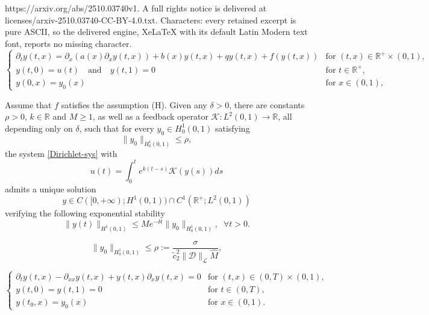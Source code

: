 \documentclass[10pt,a4paper]{amsart}
\begin{document}
https://arxiv.org/abs/2510.03740v1. A full rights notice is delivered at licenses/arxiv-2510.03740-CC-BY-4.0.txt. Characters: every retained excerpt is pure ASCII, so the delivered engine, XeLaTeX with its default Latin Modern text font, reports no missing character.
\begin{equation}\label{Dirichlet-sys}
\left\{\begin{array}{ll}
 \partial_t y(t,x) =\partial_x (a(x)\partial_x y( t,x))+{b(x)}y( t,x) +qy( t,x)+f(y( t,x))&\text{for }(t,x)\in \mathbb{R}^+ \times (0,1),\\[2mm]
y(t,0)=u(t)\quad \text{and}\quad y(t,1)=0&\text{for }t\in \mathbb{R}^+,\\[2mm]
y(0,x)=y_0(x )&\text{for }x\in (0,1),
\end{array}\right.
 \end{equation}

\begin{theorem}
     \label{main-th1}
      Assume that $f$ satisfies the assumption (H). Given any $\delta>0$, 
      there are constants $\rho>0$, $k\in \mathbb{R}$ and $M\ge 1$, as well as a {feedback operator $\mathcal{K}:L^2(0,1)\to \mathbb{R}$}, all depending only on $\delta$, such that for every $y_0\in H^1_0(0,1)$ satisfying
         \begin{equation*}
             \|y_0\|_{H^1_0(0,1)}\le \rho,
         \end{equation*}
        the system \eqref{Dirichlet-sys} with {\begin{equation}
            \label{U-MAIN}u(t)=\int_0^t e^{k(t-s)}\mathcal{K}(y(s))ds
        \end{equation}}admits a unique solution $$y\in C([0,+\infty);H^1(0,1))\cap 
 C^1(\mathbb{R}^+;L^2(0,1))  $$ verifying the following exponential stability
         \begin{equation}
         \label{exp-s}
             \|y(t)\|_{H^1(0,1)}\le Me^{-\delta t}\|y_0\|_{H^1_0(0,1)},\;\;\forall t>0.
         \end{equation}
 \end{theorem}

\begin{equation}
\label{rho}
    \|y_0\|_{H^1_0(0,1)}\le\rho:=\frac{\sigma}{\tilde{c}_2^2\|\mathcal{D}\|_{\mathcal{L}}\hat{M}},
\end{equation}

\begin{equation}
    \label{burgers-eq}
\left\{\begin{array}{ll}
\partial_t y(t,x)-\partial_{xx}y(t,x)+y (t,x) \partial_x y(t,x)=0 & \text{for }(t,x)\in (0,T)\times (0,1),\\[2mm]
y( t,0)=y( t,1)=0& \text{for }t\in (0,T),\\[2mm]
y(t_0,x)=y_0(x)& \text{for }x\in (0,1).
\end{array}\right.
\end{equation}
\end{document}
